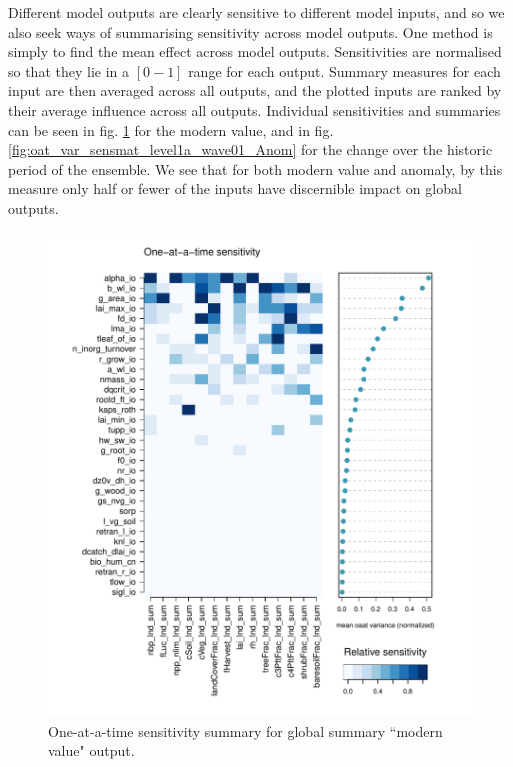 \documentclass[gmd, manuscript]{copernicus}
\begin{document}
Different model outputs are clearly sensitive to different model inputs, and so we also seek ways of summarising sensitivity across model outputs. One method is simply to find the mean effect across model outputs. Sensitivities are normalised so that they lie in a $[0 -1]$ range for each output. Summary measures for each input are then averaged across all outputs, and the plotted inputs are ranked by their average influence across all outputs. Individual sensitivities and summaries can be seen in fig. \ref{fig:oat_var_sensmat_level1a_wave01_Y} for the modern value, and in fig. \ref{fig:oat_var_sensmat_level1a_wave01_Anom} for the change over the historic period of the ensemble. We see that for both modern value and anomaly, by this measure only half or fewer of the inputs have discernible impact on global outputs.

\begin{figure}[t]
\includegraphics[width=12cm]{./figs/fig07.pdf}
\caption{One-at-a-time sensitivity summary for global summary ``modern value" output.}
\label{fig:oat_var_sensmat_level1a_wave01_Y}
\end{figure}
\end{document}
